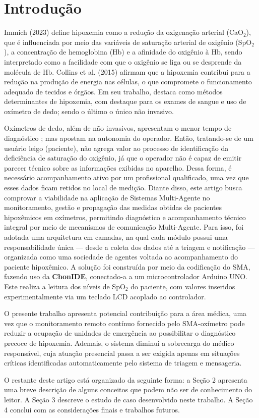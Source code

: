 \section{Introdução}\label{sec:introdução}
Immich (2023) \cite{immichCapacitacaoEmOxigenoterapia2023} define hipoxemia como a redução da oxigenação arterial (CaO$_2$), que é influenciada por meio das variáveis de saturação arterial de oxigênio (SpO$_2$), a concentração de hemoglobina (Hb) e a afinidade do oxigênio à Hb, sendo interpretado como a facilidade com que o oxigênio se liga ou se desprende da molécula de Hb. Collins et al. (2015) \cite{collins2015relating} afirmam que a hipoxemia contribui para a  redução na produção de energia nas células, o que compromete o funcionamento adequado de tecidos e órgãos. Em seu trabalho, destaca como métodos determinantes de hipoxemia, com destaque para os exames de sangue e uso de oxímetro de dedo; sendo o último o único não invasivo.

Oxímetros de dedo, além de não invasivos, apresentam o menor tempo de diagnóstico \cite{collins2015relating}; mas apostam na autonomia do operador. Então, tratando-se de um usuário leigo (paciente), não agrega valor ao processo de identificação da deficiência de saturação do oxigênio, já que o operador não é capaz de emitir parecer técnico sobre as informações exibidas no aparelho. Dessa forma, é necessário acompanhamento ativo por um profissional qualificado, uma vez que esses dados ficam retidos no local de medição. Diante disso, este artigo busca comprovar a viabilidade na aplicação de Sistemas Multi-Agente no monitoramento, gestão e propagação das medidas obtidas de pacientes hipoxêmicos em oxímetros, permitindo diagnóstico e acompanhamento técnico integral por meio de mecanismos de comunicação Multi-Agente. Para isso, foi adotada uma arquitetura em camadas, na qual cada módulo possui uma responsabilidade única — desde a coleta dos dados até a triagem e notificação — organizada como uma sociedade de agentes voltada ao acompanhamento do paciente hipoxêmico. A solução foi construída por meio da codificação do SMA, fazendo uso da \textbf{ChonIDE}, conectado-a a um microcontrolador Arduino UNO. Este realiza a leitura dos níveis de SpO$_2$ do paciente, com valores inseridos experimentalmente via um teclado LCD acoplado ao controlador.

O presente trabalho apresenta potencial contribuição para a área médica, uma vez que o monitoramento remoto contínuo fornecido pelo SMA-oxímetro pode reduzir a ocupação de unidades de emergência ao possibilitar o diagnóstico precoce de hipoxemia. Ademais, o sistema diminui a sobrecarga do médico responsável, cuja atuação presencial passa a ser exigida apenas em situações críticas identificadas automaticamente pelo sistema de triagem e mensageria.

O restante deste artigo está organizado da seguinte forma: a Seção 2 apresenta uma breve descrição de alguns conceitos que podem não ser de conhecimento do leitor. A Seção 3 descreve o estudo de caso desenvolvido neste trabalho. A Seção 4 conclui com as considerações finais e trabalhos futuros.